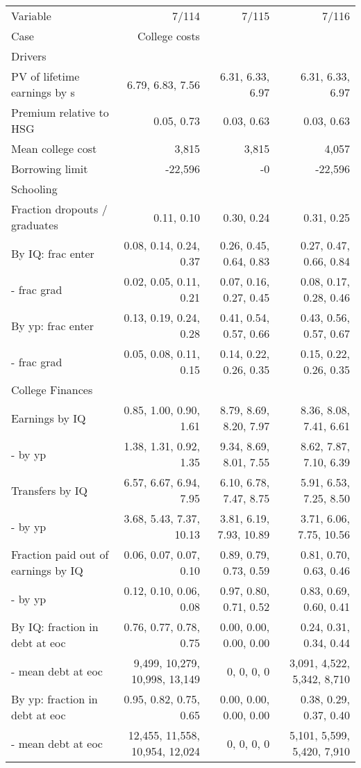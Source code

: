 \begin{tabular}{lrrr}
\hline
Variable & 7/114  & 7/115  & 7/116  \\
Case & College costs  &   &   \\
Drivers &   &   &   \\
PV of lifetime earnings by s & 6.79, 6.83, 7.56  & 6.31, 6.33, 6.97  & 6.31, 6.33, 6.97  \\
Premium relative to HSG & 0.05, 0.73  & 0.03, 0.63  & 0.03, 0.63  \\
Mean college cost & 3,815  & 3,815  & 4,057  \\
Borrowing limit & -22,596  & -0  & -22,596  \\
\hline
Schooling &   &   &   \\
Fraction dropouts / graduates & 0.11, 0.10  & 0.30, 0.24  & 0.31, 0.25  \\
By IQ: frac enter & 0.08, 0.14, 0.24, 0.37  & 0.26, 0.45, 0.64, 0.83  & 0.27, 0.47, 0.66, 0.84  \\
- frac grad & 0.02, 0.05, 0.11, 0.21  & 0.07, 0.16, 0.27, 0.45  & 0.08, 0.17, 0.28, 0.46  \\
By yp: frac enter & 0.13, 0.19, 0.24, 0.28  & 0.41, 0.54, 0.57, 0.66  & 0.43, 0.56, 0.57, 0.67  \\
- frac grad & 0.05, 0.08, 0.11, 0.15  & 0.14, 0.22, 0.26, 0.35  & 0.15, 0.22, 0.26, 0.35  \\
\hline
College Finances &   &   &   \\
Earnings by IQ & 0.85, 1.00, 0.90, 1.61  & 8.79, 8.69, 8.20, 7.97  & 8.36, 8.08, 7.41, 6.61  \\
- by yp & 1.38, 1.31, 0.92, 1.35  & 9.34, 8.69, 8.01, 7.55  & 8.62, 7.87, 7.10, 6.39  \\
Transfers by IQ & 6.57, 6.67, 6.94, 7.95  & 6.10, 6.78, 7.47, 8.75  & 5.91, 6.53, 7.25, 8.50  \\
- by yp & 3.68, 5.43, 7.37, 10.13  & 3.81, 6.19, 7.93, 10.89  & 3.71, 6.06, 7.75, 10.56  \\
Fraction paid out of earnings by IQ & 0.06, 0.07, 0.07, 0.10  & 0.89, 0.79, 0.73, 0.59  & 0.81, 0.70, 0.63, 0.46  \\
- by yp & 0.12, 0.10, 0.06, 0.08  & 0.97, 0.80, 0.71, 0.52  & 0.83, 0.69, 0.60, 0.41  \\
By IQ: fraction in debt at eoc & 0.76, 0.77, 0.78, 0.75  & 0.00, 0.00, 0.00, 0.00  & 0.24, 0.31, 0.34, 0.44  \\
- mean debt at eoc & 9,499, 10,279, 10,998, 13,149  & 0, 0, 0, 0  & 3,091, 4,522, 5,342, 8,710  \\
By yp: fraction in debt at eoc & 0.95, 0.82, 0.75, 0.65  & 0.00, 0.00, 0.00, 0.00  & 0.38, 0.29, 0.37, 0.40  \\
- mean debt at eoc & 12,455, 11,558, 10,954, 12,024  & 0, 0, 0, 0  & 5,101, 5,599, 5,420, 7,910  \\
\hline
\end{tabular}%
